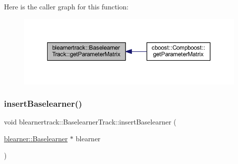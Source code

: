 Here is the caller graph for this function\+:\nopagebreak
\begin{figure}[H]
\begin{center}
\leavevmode
\includegraphics[width=350pt]{classblearnertrack_1_1_baselearner_track_a4b6d2d8b585148c71ed5b6055c9ab08c_icgraph}
\end{center}
\end{figure}
\mbox{\label{classblearnertrack_1_1_baselearner_track_abc5f42093449e665b5b0dfeee8570953}} 
\subsubsection{\texorpdfstring{insert\+Baselearner()}{insertBaselearner()}}
{\footnotesize\ttfamily void blearnertrack\+::\+Baselearner\+Track\+::insert\+Baselearner (\begin{DoxyParamCaption}\item[{\hyperlink{classblearner_1_1_baselearner}{blearner\+::\+Baselearner} $\ast$}]{blearner }\end{DoxyParamCaption})}

